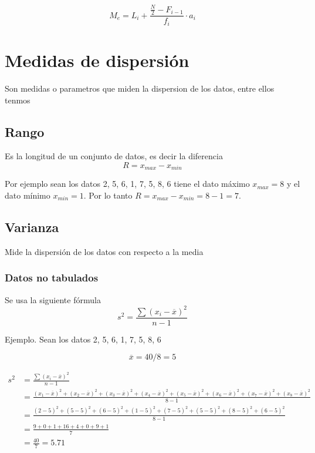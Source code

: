 \documentclass[
  11pt,
]{krantz}
\theoremstyle{definition}
\theoremstyle{definition}
\theoremstyle{definition}
\theoremstyle{definition}
\theoremstyle{remark}
\begin{document}
\[  M_e=L_{i}+\frac{\frac{N}{2}-F_{i-1}}{f_{i}}\cdot a_{i}\]

\hypertarget{medidas-de-dispersiuxf3n}{%
\chapter{Medidas de dispersión}\label{medidas-de-dispersiuxf3n}}

Son medidas o parametros que miden la dispersion de los datos, entre ellos tenmos

\hypertarget{rango}{%
\section{Rango}\label{rango}}

Es la longitud de un conjunto de datos, es decir la diferencia
\[R=x_{max}-x_{min}\]

Por ejemplo sean los datos 2, 5, 6, 1, 7, 5, 8, 6
tiene el dato máximo \(x_{max}=8\) y el dato mínimo \(x_{min}=1\). Por lo tanto \(R=x_{max}-x_{min}=8-1=7.\)

\hypertarget{varianza}{%
\section{Varianza}\label{varianza}}

Mide la dispersión de los datos con respecto a la media

\hypertarget{datos-no-tabulados}{%
\subsection{Datos no tabulados}\label{datos-no-tabulados}}

Se usa la siguiente fórmula
\[s^2=\frac{\sum\left(x_i-\overline{x}\right )^2}{n-1}\]

Ejemplo. Sean los datos 2, 5, 6, 1, 7, 5, 8, 6

\[\overline{x}=40/8=5\]

\[
\begin{aligned}
s^2&=\frac{\sum\left(x_i-\overline{x}\right )^2}{n-1}\\
&=\frac{\left(x_1-\overline{x}\right )^2+\left(x_2-\overline{x}\right )^2+\left(x_3-\overline{x}\right )^2+\left(x_4-\overline{x}\right )^2+\left(x_5-\overline{x}\right )^2+\left(x_6-\overline{x}\right )^2+\left(x_7-\overline{x}\right )^2+\left(x_8-\overline{x}\right )^2}{8-1}\\
&=\frac{\left(2-5\right )^2+\left(5-5\right )^2+\left(6-5\right )^2+\left(1-5\right )^2+\left(7-5\right )^2+\left(5-5\right )^2+\left(8-5\right )^2+\left(6-5\right )^2}{8-1}\\
&=\frac{9+0+1+16+4+0+9+1}{7}\\
&=\frac{40}{7}=5.71
\end{aligned}
\]
\end{document}
